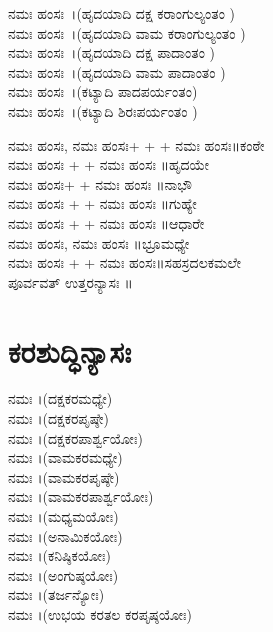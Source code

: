  ನಮಃ ಹಂಸಃ~।(ಹೃದಯಾದಿ ದಕ್ಷ ಕರಾಂಗುಲ್ಯಂತಂ )\\
 ನಮಃ ಹಂಸಃ~।(ಹೃದಯಾದಿ ವಾಮ ಕರಾಂಗುಲ್ಯಂತಂ )\\
 ನಮಃ ಹಂಸಃ~।(ಹೃದಯಾದಿ ದಕ್ಷ ಪಾದಾಂತಂ )\\
 ನಮಃ ಹಂಸಃ~।(ಹೃದಯಾದಿ ವಾಮ ಪಾದಾಂತಂ )\\
 ನಮಃ ಹಂಸಃ~।(ಕಟ್ಯಾದಿ ಪಾದಪರ್ಯಂತಂ)\\
 ನಮಃ ಹಂಸಃ~।(ಕಟ್ಯಾದಿ ಶಿರಃಪರ್ಯಂತಂ )\\

 ನಮಃ ಹಂಸಃ,  ನಮಃ ಹಂಸಃ+ + + ನಮಃ ಹಂಸಃ॥ಕಂಠೇ\\
 ನಮಃ ಹಂಸಃ + +  ನಮಃ ಹಂಸಃ ॥ಹೃದಯೇ\\
 ನಮಃ ಹಂಸಃ+ +  ನಮಃ ಹಂಸಃ ॥ನಾಭೌ\\
 ನಮಃ ಹಂಸಃ + +  ನಮಃ ಹಂಸಃ ॥ಗುಹ್ಯೇ\\
 ನಮಃ ಹಂಸಃ + +  ನಮಃ ಹಂಸಃ ॥ಆಧಾರೇ\\
 ನಮಃ ಹಂಸಃ,  ನಮಃ ಹಂಸಃ ॥ಭ್ರೂಮಧ್ಯೇ\\
 ನಮಃ ಹಂಸಃ + + ನಮಃ ಹಂಸಃ॥ಸಹಸ್ರದಲಕಮಲೇ\\
 ಪೂರ್ವವತ್ ಉತ್ತರನ್ಯಾಸಃ ॥
\section{ಕರಶುದ್ಧಿನ್ಯಾಸಃ}
 ನಮಃ ।(ದಕ್ಷಕರಮಧ್ಯೇ)\\
 ನಮಃ ।(ದಕ್ಷಕರಪೃಷ್ಠೇ)\\
 ನಮಃ ।(ದಕ್ಷಕರಪಾರ್ಶ್ವಯೋಃ)\\
 ನಮಃ ।(ವಾಮಕರಮಧ್ಯೇ)\\
 ನಮಃ ।(ವಾಮಕರಪೃಷ್ಠೇ)\\
 ನಮಃ ।(ವಾಮಕರಪಾರ್ಶ್ವಯೋಃ)\\
 ನಮಃ ।(ಮಧ್ಯಮಯೋಃ)\\
 ನಮಃ ।(ಅನಾಮಿಕಯೋಃ)\\
 ನಮಃ ।(ಕನಿಷ್ಠಿಕಯೋಃ)\\
 ನಮಃ ।(ಅಂಗುಷ್ಠಯೋಃ)\\
 ನಮಃ ।(ತರ್ಜನ್ಯೋಃ)\\
 ನಮಃ ।(ಉಭಯ ಕರತಲ ಕರಪೃಷ್ಠಯೋಃ)


